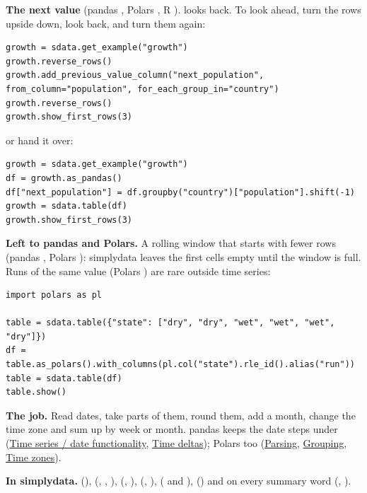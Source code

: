\textbf{The next value} (pandas , Polars , R ).
 looks back. To look ahead, turn the rows upside down, look back,
and turn them again:

\begin{lstlisting}[style=py]
growth = sdata.get_example("growth")
growth.reverse_rows()
growth.add_previous_value_column("next_population", from_column="population", for_each_group_in="country")
growth.reverse_rows()
growth.show_first_rows(3)
\end{lstlisting}

or hand it over:

\begin{lstlisting}[style=py]
growth = sdata.get_example("growth")
df = growth.as_pandas()
df["next_population"] = df.groupby("country")["population"].shift(-1)
growth = sdata.table(df)
growth.show_first_rows(3)
\end{lstlisting}

\textbf{Left to pandas and Polars.} A rolling window that starts with fewer rows (pandas
, Polars ): simplydata leaves the first cells empty until the
window is full. Runs of the same value (Polars ) are rare outside time series:

\begin{lstlisting}[style=py]
import polars as pl

table = sdata.table({"state": ["dry", "dry", "wet", "wet", "wet", "dry"]})
df = table.as_polars().with_columns(pl.col("state").rle_id().alias("run"))
table = sdata.table(df)
table.show()
\end{lstlisting}


\textbf{The job.} Read dates, take parts of them, round them, add a month, change the time zone and sum
up by week or month. pandas keeps the date steps under 
(\href{https://pandas.pydata.org/docs/user_guide/timeseries.html}{Time series / date functionality},
\href{https://pandas.pydata.org/docs/user_guide/timedeltas.html}{Time deltas}); Polars too
(\href{https://docs.pola.rs/user-guide/transformations/time-series/parsing/}{Parsing},
\href{https://docs.pola.rs/user-guide/transformations/time-series/rolling/}{Grouping},
\href{https://docs.pola.rs/user-guide/transformations/time-series/timezones/}{Time zones}).

\textbf{In simplydata.}  (),
 (, , ),
 (, ), 
(, ),  ( and
),  () and  on every summary word
(, ).

